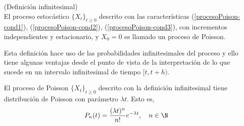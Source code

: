     \begin{Def}(Definición infinitesimal)\\
         El proceso estocástico $\{X_t\}_{t\geq 0}$
        descrito con las características (\ref{procesoPoison-cond1}), (\ref{procesoPoison-cond2}), (\ref{procesoPoison-cond3}), con incrementos independientes y estacionario, y $X_0=0$ es llamado un proceso de Poisson.
    \end{Def}
    Esta definición hace uso de las probabilidades infinitesimales del proceso y ello tiene algunas ventajas desde el punto de vista de la interpretación de
    lo que sucede en un intervalo infinitesimal de tiempo $[t,t+h)$.
    \begin{Prop}
        El proceso de Poisson $\{X_t\}_{t\geq 0}$ descrito con la definición infinitesimal tiene distribución de Poisson con parámetro $\lambda t.$ Esto es,
        $$P_n(t)=\frac{(\lambda t)^n}{n!}e^{-\lambda t}, \quad n\in\N$$
    \end{Prop}
